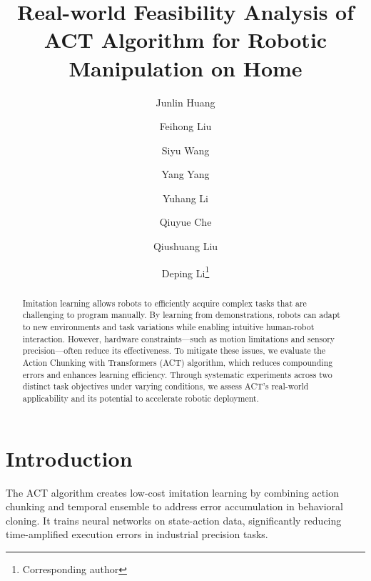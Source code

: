 \documentclass[runningheads]{llncs}
\begin{document}
\title{Real-world Feasibility Analysis of ACT Algorithm for Robotic Manipulation on Home}


\author{
  Junlin Huang \and
  Feihong Liu \and
  Siyu Wang \and
  Yang Yang \and
  Yuhang Li \and
  Qiuyue Che \and
  Qiushuang Liu \and
  Deping Li\thanks{Corresponding author}  %
}


\maketitle



%
\begin{abstract}
Imitation learning allows robots to efficiently acquire complex tasks that are challenging to program manually. By learning from demonstrations, robots can adapt to new environments and task variations while enabling intuitive human-robot interaction. However, hardware constraints—such as motion limitations and sensory precision—often reduce its effectiveness. To mitigate these issues, we evaluate the Action Chunking with Transformers (ACT) algorithm, which reduces compounding errors and enhances learning efficiency. Through systematic experiments across two distinct task objectives under varying conditions, we assess ACT’s real-world applicability and its potential to accelerate robotic deployment.


\end{abstract}
%
%
%
\section{Introduction}
The ACT algorithm creates low-cost imitation learning by combining action chunking and temporal ensemble to address error accumulation in behavioral cloning. It trains neural networks on state-action data, significantly reducing time-amplified execution errors in industrial precision tasks. 
 
\end{document}
